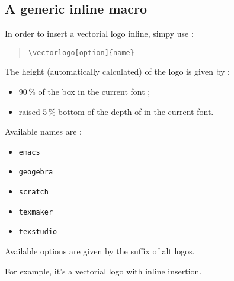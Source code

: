 \documentclass[11pt,a4paper]{ltxdoc}
\begin{document}
\begin{tcblisting}{}
\par
{}\par
{}\par
{}\par
{}
\end{tcblisting}

\pagebreak

\subsection{A generic inline macro}

In order to insert a vectorial logo inline, simpy use :

\begin{quote}
\begin{verbatim}
\vectorlogo[option]{name}
\end{verbatim}
\end{quote}

The height (automatically calculated) of the logo is given by :

\begin{itemize}
	\item 90\,\% of the box  in the current font ;
	\item raised 5\,\% bottom of the depth of  in the current font.
\end{itemize}

Available \textsf{names} are :

\begin{multicols}{3}
	\begin{itemize}
		\item \texttt{emacs}
		\item \texttt{geogebra}
		\item \texttt{scratch}
		\item \texttt{texmaker}
		\item \texttt{texstudio}
	\end{itemize}
\end{multicols}

Available \textsf{options} are given by the suffix of alt logos.

\begin{tcblisting}{}
{\Large\sffamily For example, it's a vectorial logo  with inline insertion.}
\end{tcblisting}
\end{document}
